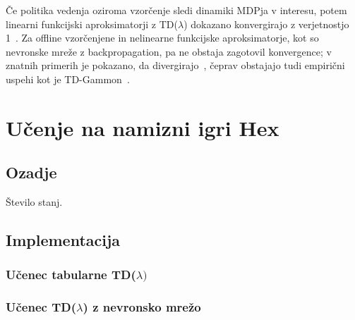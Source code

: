 \documentclass[a4paper, oneside, 12pt]{report}
\begin{document}
Če politika vedenja oziroma vzorčenje sledi dinamiki MDPja v interesu, potem linearni funkcijski aproksimatorji z TD($\lambda$) dokazano konvergirajo z verjetnostjo 1~\cite{AnAnalysisOfTemporalDifferenceLearningWithFunctionApproximation}. Za offline vzorčenjene in nelinearne funkcijske aproksimatorje, kot so nevronske mreže z backpropagation, pa ne obstaja zagotovil konvergence; v znatnih primerih je pokazano, da divergirajo~\cite{GeneralizationInReinforcementLearningSafelyApproximatingTheValueFunction}, čeprav obstajajo tudi empirični uspehi kot je TD-Gammon~\cite{PracticalIssuesInTemporalDifferenceLearning}.

\chapter{Učenje na namizni igri Hex}
\thispagestyle{fancy}
\section{Ozadje}
Število stanj.
\section{Implementacija}
\subsection{Učenec tabularne TD($\lambda)$}
\subsection{Učenec TD($\lambda$) z nevronsko mrežo}
\end{document}
